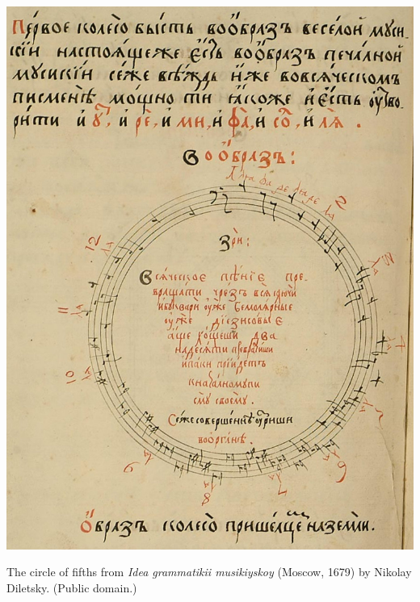 \documentclass[12pt,noauthor,nooutcomes, instructornotes]{ximera}
\begin{document}
\begin{center}
        \includegraphics[width=.7\textwidth]{scales/Diletsky_circle.jpg}
        
        The circle of fifths from \emph{Idea grammatikii musikiyskoy} (Moscow, 1679) by Nikolay Diletsky. (Public domain.)
\end{center}
\end{document}
